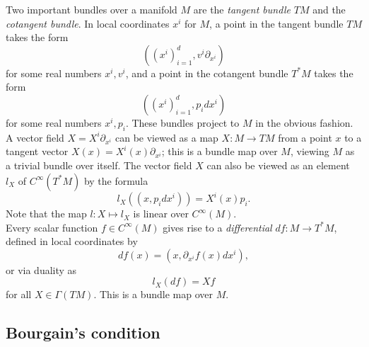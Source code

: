 \documentclass{article}
\numberwithin{equation}{section}
\theoremstyle{plain}
\begin{document}
\smallskip

Two important bundles over a manifold $M$ are the \emph{tangent bundle} $TM$ and the \emph{cotangent bundle}.  In local coordinates $x^i$ for $M$, a point in the tangent bundle $TM$ takes the form
$$ ( (x^i)_{i=1}^d, v^i \partial_{x^i} ) $$
for some real numbers $x^i, v^i$, and a point in the cotangent bundle $T^* M$ takes the form
$$ ( (x^i)_{i=1}^d, p_i dx^i ) $$
for some real numbers $x^i, p_i$.  These bundles project to $M$ in the obvious fashion. A vector field $X = X^i \partial_{x^i}$ can be viewed as a map $X : M \to TM$ from a point $x$ to a tangent vector $X(x) = X^i(x) \partial_{x^i}$; this is a bundle map over $M$, viewing $M$ as a trivial bundle over itself.  The vector field $X$ can also be viewed as an element $l_X$ of $C^\infty(T^* M)$ by the formula
$$ l_X( (x, p_i dx^i) ) = X^i(x) p_i.$$
Note that the map $l: X \mapsto l_X$ is linear over $C^\infty(M)$.\\

Every scalar function $f \in C^\infty(M)$ gives rise to a \emph{differential} $df: M \to T^* M$, defined in local coordinates by
$$ df(x) = (x, \partial_{x^i} f(x) dx^i),$$
or via duality as
\begin{equation}\label{lxdf}
    l_X(df) = Xf
\end{equation}
for all $X \in \Gamma(TM)$. This is a bundle map over $M$.


\subsection{Bourgain's condition}
\end{document}
